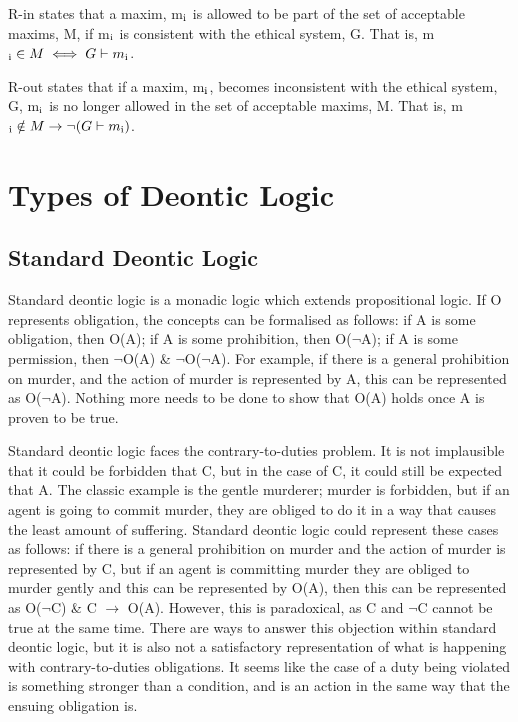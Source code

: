 \documentclass{l4proj}
\begin{document}
R-in states that a maxim, m\( \textsubscript{i} \) is allowed to be part of the set of acceptable maxims, M, if m\( \textsubscript{i} \) is consistent with the ethical system, G. That is, m\( \textsubscript{i}  \in M \iff G \vdash m \textsubscript{i} \). 

R-out states that if a maxim, m\( \textsubscript{i} \), becomes inconsistent with the ethical system, G, m\( \textsubscript{i} \) is no longer allowed in the set of acceptable maxims, M. That is, m\( \textsubscript{i}  \notin M \rightarrow \neg(G \vdash m \textsubscript{i}) \). 


\section{Types of Deontic Logic}

\subsection{Standard Deontic Logic}
Standard deontic logic is a monadic logic which extends propositional logic. If O represents obligation, the concepts can be formalised as follows: if A is some obligation, then O(A); if A is some prohibition, then O(\( \neg \)A); if A is some permission, then \( \neg \)O(A) \& \( \neg \)O(\( \neg \)A). For example, if there is a general prohibition on murder, and the action of murder is represented by A, this can be represented as O(\( \neg \)A). Nothing more needs to be done to show that O(A) holds once A is proven to be true. 

Standard deontic logic faces the contrary-to-duties problem. It is not implausible that it could be forbidden that C, but in the case of C, it could still be expected that A. The classic example is the gentle murderer; murder is forbidden, but if an agent is going to commit murder, they are obliged to do it in a way that causes the least amount of suffering. Standard deontic logic could represent these cases as follows: if there is a general prohibition on murder and the action of murder is represented by C, but if an agent is committing murder they are obliged to murder gently and this can be represented by O(A), then this can be represented as O(\( \neg \)C) \& C \( \to \) O(A). However, this is paradoxical, as C and \( \neg \)C cannot be true at the same time. There are ways to answer this objection within standard deontic logic, but it is also not a satisfactory representation of what is happening with contrary-to-duties obligations. It seems like the case of a duty being violated is something stronger than a condition, and is an action in the same way that the ensuing obligation is. 
\end{document}

